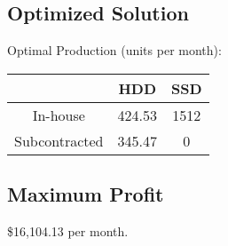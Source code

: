 \documentclass[12pt]{article}
\begin{document}
\subsection*{Optimized Solution}
Optimal Production (units per month):

\begin{tabular}{|c|c|c|}
\hline
 & HDD & SSD \\
\hline
In-house & 424.53 & 1512 \\
Subcontracted & 345.47 & 0 \\
\hline
\end{tabular}

\subsection*{Maximum Profit}
\$16,104.13 per month.

\vspace{290pt}
\end{document}
